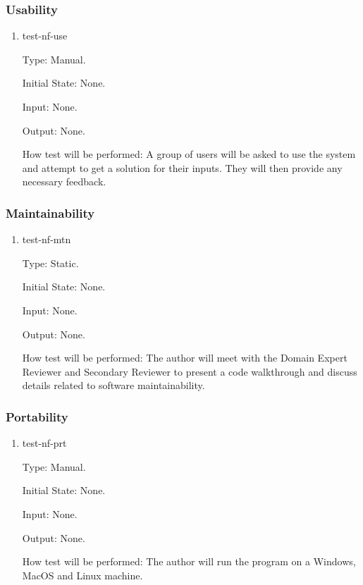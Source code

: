 \documentclass[12pt, titlepage]{article}
\begin{document}
\subsubsection{Usability}
\begin{enumerate}

\item{test-nf-use\\}

Type: Manual.
					
Initial State: None.
					
Input: None.
					
Output: None.
					
How test will be performed: A group of users will be asked to use the system and attempt to get a solution for their inputs. They will then provide any necessary feedback. 
\end{enumerate}

\subsubsection{Maintainability}
\begin{enumerate}

\item{test-nf-mtn\\}

Type: Static.
					
Initial State: None.
					
Input: None.
					
Output: None.
					
How test will be performed: The author will meet with the Domain Expert Reviewer and Secondary Reviewer to present a code walkthrough and discuss details related to software maintainability. 
\end{enumerate}

\subsubsection{Portability}
\begin{enumerate}

\item{test-nf-prt\\}

Type: Manual.
					
Initial State: None.
					
Input: None.
					
Output: None.
					
How test will be performed: The author will run the program on a Windows, MacOS and Linux machine. 
\end{enumerate}
\end{document}
